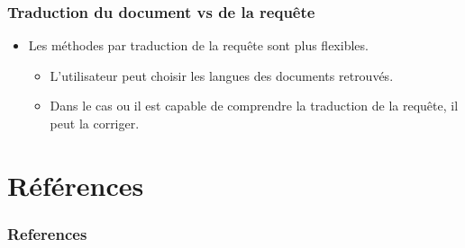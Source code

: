 \documentclass[12pt,aspectratio=43,dvipsnames,table]{beamer}
\begin{document}


\begin{frame}
    \frametitle{Traduction du document vs de la requête}
    \begin{itemize}
        \item Les méthodes par traduction de la requête sont plus flexibles.
        \begin{itemize}
            \item L'utilisateur peut choisir les langues des documents 
                  retrouvés.
            \item Dans le cas ou il est capable de comprendre la traduction de 
                  la requête, il peut la corriger.
        \end{itemize}
    \end{itemize}


\end{frame}

\begin{frame}
    \frametitle{}
\end{frame}

\appendix

\section{Références}


\begin{frame}[allowframebreaks]
    \frametitle{References}
    
    
\end{frame}
\end{document}
